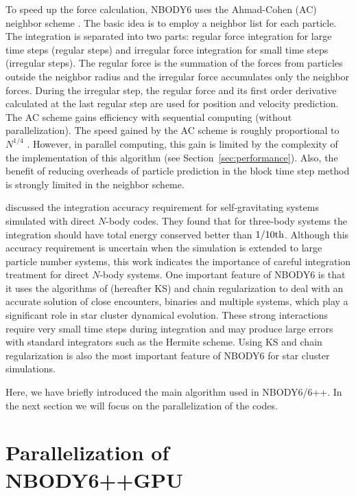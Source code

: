 \documentclass[usenatbib,aas_macros]{mn2e}
\def\nbody{NBODY6 }
\def\nb{$N$-body }
\begin{document}
To speed up the force calculation, \nbody uses the Ahmad-Cohen (AC) neighbor scheme \citep{Ahmad1973}.
The basic idea is to employ a neighbor list for each particle. 
The integration is separated into two parts: regular force integration for large time steps (regular steps) and irregular force integration for small time steps (irregular steps). 
The regular force is the summation of the forces from particles outside the neighbor radius and the irregular force accumulates only the neighbor forces. 
During the irregular step, the regular force and its first order derivative calculated at the last regular step are used for position and velocity prediction.
The AC scheme gains efficiency with sequential computing (without parallelization).
The speed gained by the AC scheme is roughly proportional to $N^{1/4}$ \citep{Makino1988,Makino1992}.
However, in parallel computing, this gain is limited by the complexity of the implementation of this algorithm (see Section~\ref{sec:performance}). 
Also, the benefit of reducing overheads of particle prediction in the block time step method is strongly limited in the neighbor scheme.

\cite{PZ2014} discussed the integration accuracy requirement for self-gravitating systems simulated with direct \nb codes.
They found that for three-body systems the integration should have total energy conserved better than $1/10{\rm th}$. 
Although this accuracy requirement is uncertain when the simulation is extended to large particle number systems, this work indicates the importance of careful integration treatment for direct \nb systems.
One important feature of \nbody is that it uses the algorithms of \cite{Kustaanheimo1965} (hereafter KS) and chain regularization \citep{Mikkola1993} to deal with an accurate solution of close encounters, binaries and multiple systems, which play a significant role in star cluster dynamical evolution.
These strong interactions require very small time steps during integration and may produce large errors with standard integrators such as the Hermite scheme. 
Using KS and chain regularization is also the most important feature of \nbody for star cluster simulations.

Here, we have briefly introduced the main algorithm used in NBODY6/6++.
In the next section we will focus on the parallelization of the codes.

\section{Parallelization of NBODY6++GPU}
\label{sec:new}
\end{document}

